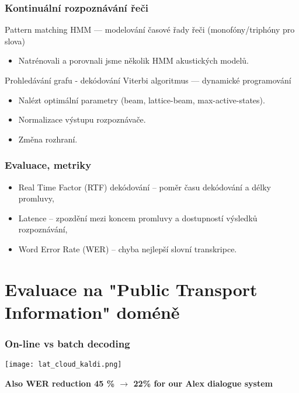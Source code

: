 \begin{frame}\frametitle{Kontinuální rozpoznávání řeči} 
    \begin{block}{Pattern matching}
        HMM --- modelování časové řady řeči (monofóny/triphóny pro slova)
        \begin{itemize}
            \item Natrénovali a porovnali jsme několik HMM akustických modelů.
        \end{itemize}
    \end{block}
    \begin{exampleblock}{Prohledávání grafu - dekódování}
        Viterbi algoritmus --- dynamické programování
        \begin{itemize}
            \item Nalézt optimální parametry (beam, lattice-beam, max-active-states).
            \item Normalizace výstupu rozpoznávače.
            \item Změna rozhraní.
        \end{itemize}
    \end{exampleblock}
\end{frame}


\begin{frame}\frametitle{Evaluace, metriky} 
    \begin{itemize}
        \item Real Time Factor (RTF) dekódování -- poměr času dekódování a délky promluvy,
        \item Latence -- zpozdění mezi koncem promluvy a dostupností výsledků rozpoznávání,
        \item Word Error Rate (WER) -- chyba nejlepší slovní transkripce.
    \end{itemize}
\end{frame}


\section[Evaluace na "PTI"]{Evaluace na "Public Transport Information" doméně}%

\begin{frame}\frametitle{On-line vs batch decoding} 
    \begin{center}
        \texttt{[image: lat\_cloud\_kaldi.png]}
    \end{center}
    \bf {Also WER reduction 45 \% $\longrightarrow$ 22\%} for our Alex dialogue system 
\end{frame}

